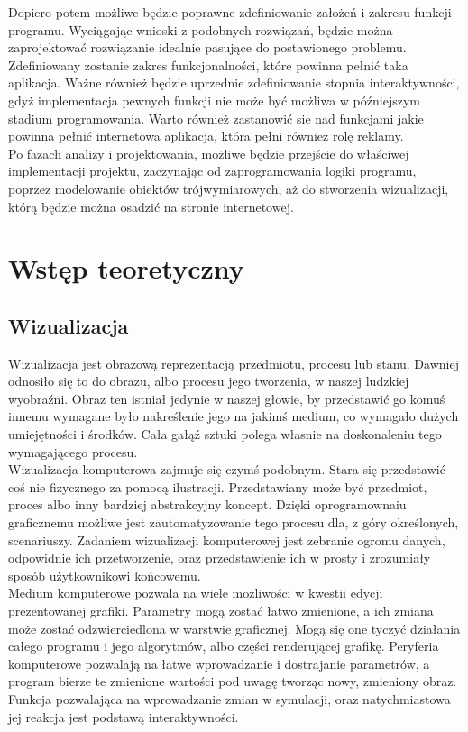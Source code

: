 \documentclass{article} %
\begin{document}
Dopiero potem możliwe będzie poprawne zdefiniowanie założeń i zakresu funkcji programu. Wyciągając wnioski z podobnych rozwiązań, będzie można zaprojektować rozwiązanie idealnie pasujące do postawionego problemu. Zdefiniowany zostanie zakres funkcjonalności, które powinna pełnić taka aplikacja. Ważne również będzie uprzednie zdefiniowanie stopnia interaktywności, gdyż implementacja pewnych funkcji nie może być możliwa w późniejszym stadium programowania. Warto również zastanowić sie nad funkcjami jakie powinna pełnić internetowa aplikacja, która pełni również rolę reklamy.
\\

Po fazach analizy i projektowania, możliwe będzie przejście do właściwej implementacji projektu, zaczynając od zaprogramowania logiki programu, poprzez modelowanie obiektów trójwymiarowych, aż do stworzenia wizualizacji, którą będzie można osadzić na stronie internetowej.
\\



\section{Wstęp teoretyczny}
   
    \subsection{Wizualizacja}
        Wizualizacja jest obrazową reprezentacją przedmiotu, procesu lub stanu. Dawniej odnosiło się to do obrazu, albo procesu jego tworzenia, w naszej ludzkiej wyobraźni. Obraz ten istniał jedynie w naszej głowie, by przedstawić go komuś innemu wymagane było nakreślenie jego na jakimś medium, co wymagało dużych umiejętności i środków. Cała gałąź sztuki polega własnie na doskonaleniu tego wymagającego procesu.
        \\
        
        Wizualizacja komputerowa zajmuje się czymś podobnym. Stara się przedstawić coś nie fizycznego za pomocą ilustracji. Przedstawiany może być przedmiot, proces albo inny bardziej abstrakcyjny koncept. Dzięki oprogramownaiu graficznemu możliwe jest zautomatyzowanie tego procesu dla, z góry określonych, scenariuszy. Zadaniem wizualizacji komputerowej jest zebranie ogromu danych, odpowidnie ich przetworzenie, oraz przedstawienie ich w prosty i zrozumiały sposób użytkownikowi końcowemu.
        \\
        
        Medium komputerowe pozwala na wiele możliwości w kwestii edycji prezentowanej grafiki. Parametry mogą zostać łatwo zmienione, a ich zmiana może zostać odzwierciedlona w warstwie graficznej. Mogą się one tyczyć działania całego programu i jego algorytmów, albo części renderującej grafikę. Peryferia komputerowe pozwalają na łatwe wprowadzanie i dostrajanie parametrów, a program bierze te zmienione wartości pod uwagę tworząc nowy, zmieniony obraz. Funkcja pozwalająca na wprowadzanie zmian w symulacji, oraz natychmiastowa jej reakcja jest podstawą interaktywności.
        \\
            
\end{document}
